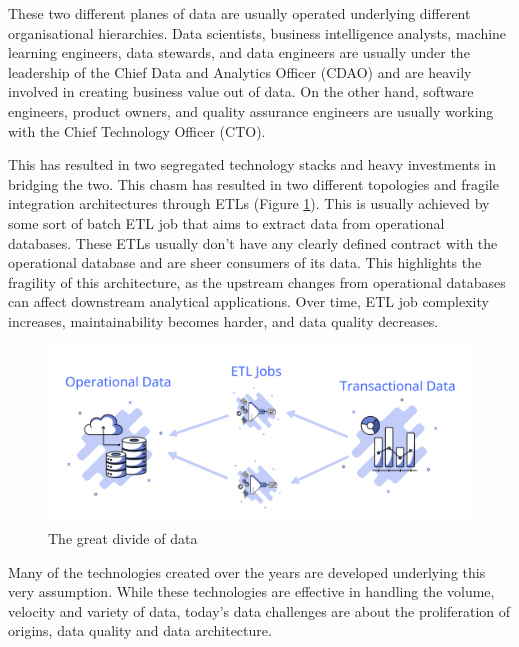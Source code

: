 \documentclass[preprint,12pt]{elsarticle}
\begin{document}
These two different planes of data are usually operated underlying different organisational hierarchies. Data scientists, business intelligence analysts, machine learning engineers, data stewards, and data engineers are usually under the leadership of the Chief Data and Analytics Officer (CDAO) and are heavily involved in creating business value out of data. On the other hand, software engineers, product owners, and quality assurance engineers are usually working with the Chief Technology Officer (CTO).

This has resulted in two segregated technology stacks and heavy investments in bridging the two. This chasm has resulted in two different topologies and fragile integration architectures through ETLs (Figure \ref{fig:dataPlanes}). This is usually achieved by some sort of batch ETL job that aims to extract data from operational databases. These ETLs usually don't have any clearly defined contract with the operational database and are sheer consumers of its data. This highlights the fragility of this architecture, as the upstream changes from operational databases can affect downstream analytical applications. Over time, ETL job complexity increases, maintainability becomes harder, and data quality decreases. 

\begin{figure}[h]
  \includegraphics[width=\textwidth]{images/data-planes.png}
  \caption{The great divide of data}
  \label{fig:dataPlanes}
\end{figure}

Many of the technologies created over the years are developed underlying this very assumption. While these technologies are effective in handling the volume, velocity and variety of data, today's data challenges are about the proliferation of origins, data quality and data architecture. 

\end{document}
